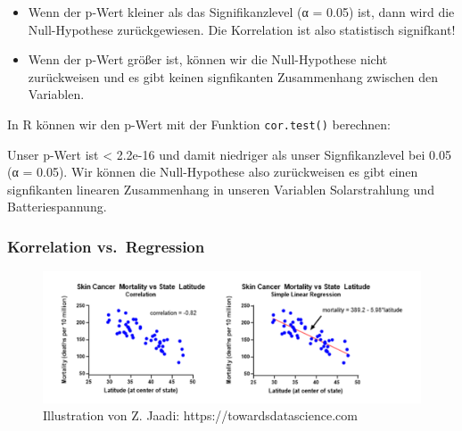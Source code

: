 \documentclass[
]{article}
\newenvironment{Shaded}{\begin{snugshade}}{\end{snugshade}}
\newcommand{\AttributeTok}[1]{\textcolor[rgb]{0.77,0.63,0.00}{#1}}
\newcommand{\DocumentationTok}[1]{\textcolor[rgb]{0.56,0.35,0.01}{\textbf{\textit{#1}}}}
\newcommand{\FunctionTok}[1]{\textcolor[rgb]{0.00,0.00,0.00}{#1}}
\newcommand{\NormalTok}[1]{#1}
\newcommand{\SpecialCharTok}[1]{\textcolor[rgb]{0.00,0.00,0.00}{#1}}
\newcommand{\StringTok}[1]{\textcolor[rgb]{0.31,0.60,0.02}{#1}}
\providecommand{\tightlist}{%
  \setlength{\itemsep}{0pt}\setlength{\parskip}{0pt}}
\begin{document}
\begin{itemize}
\tightlist
\item
  Wenn der p-Wert kleiner als das Signifikanzlevel (α = 0.05) ist, dann wird die Null-Hypothese zurückgewiesen. Die Korrelation ist also statistisch signifkant!
\item
  Wenn der p-Wert größer ist, können wir die Null-Hypothese nicht zurückweisen und es gibt keinen signfikanten Zusammenhang zwischen den Variablen.
\end{itemize}

In R können wir den p-Wert mit der Funktion \texttt{cor.test()} berechnen:

\begin{Shaded}
\end{Shaded}

Unser p-Wert ist \textless{} 2.2e-16 und damit niedriger als unser Signfikanzlevel bei 0.05 (α = 0.05). Wir können die Null-Hypothese also zurückweisen es gibt einen signfikanten linearen Zusammenhang in unseren Variablen Solarstrahlung und Batteriespannung.

\hypertarget{korrelation-vs.-regression}{%
\subsubsection{Korrelation vs.~Regression}\label{korrelation-vs.-regression}}

\begin{figure}

{\centering \includegraphics[width=1\linewidth]{images/060} 

}

\caption{Illustration von Z. Jaadi: https://towardsdatascience.com}\label{fig:unnamed-chunk-271}
\end{figure}
\end{document}
